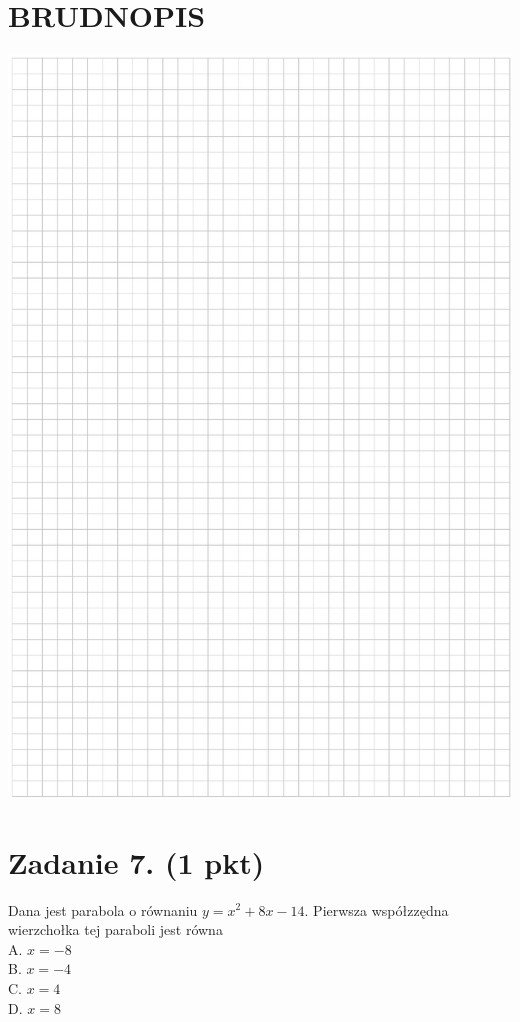 \documentclass[10pt]{article}
\begin{document}
\section*{BRUDNOPIS}
\begin{center}
\includegraphics[max width=\textwidth]{2024_11_21_6a8be49478f78d0689cfg-03}
\end{center}

\section*{Zadanie 7. (1 pkt)}
Dana jest parabola o równaniu \(y=x^{2}+8 x-14\). Pierwsza współzzędna wierzchołka tej paraboli jest równa\\
A. \(x=-8\)\\
B. \(x=-4\)\\
C. \(x=4\)\\
D. \(x=8\)
\end{document}
